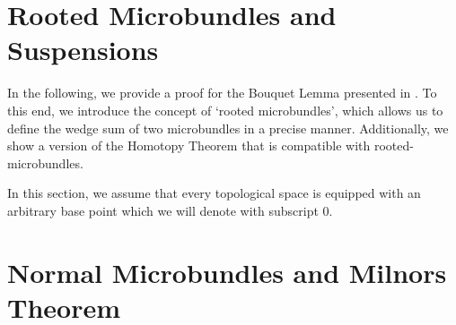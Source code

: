 \documentclass{article}
\begin{document}
\section{Rooted Microbundles and Suspensions}\label{chapter::suspension}
\begin{myparagraph}
    In the following,
    we provide a proof for the Bouquet Lemma presented in .
    To this end, we introduce the concept of `rooted microbundles',
    which allows us to define the wedge sum of two microbundles in a precise manner.
    Additionally, we show a version of the Homotopy Theorem
    that is compatible with rooted-microbundles.

    In this section,
    we assume that every topological space is equipped with an arbitrary base point
    which we will denote with subscript $0$.
\end{myparagraph}


\section{Normal Microbundles and Milnors Theorem}\label{chapter::normal}


\end{document}
